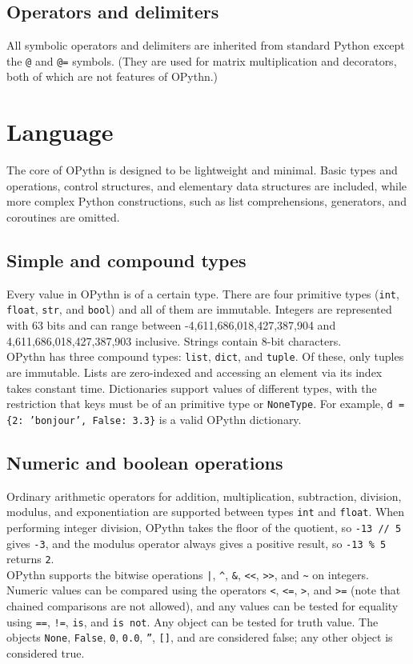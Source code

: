 \documentclass[11pt, twoside]{article}
\newcommand{\ms}{\texttt}
\begin{document}
    \subsection{Operators and delimiters}
    All symbolic operators and delimiters are inherited from standard Python except the \ms{@} and \ms{@=} symbols. (They are used for matrix multiplication and decorators, both of which are not features of OPythn.)

\section{Language}
    The core of OPythn is designed to be lightweight and minimal. Basic types and operations, control structures, and elementary data structures are included, while more complex Python constructions, such as list comprehensions, generators, and coroutines are omitted.
    \subsection{Simple and compound types}
    Every value in OPythn is of a certain type. There are four primitive types (\ms{int}, \ms{float}, \ms{str}, and \ms{bool}) and all of them are immutable. Integers are represented with 63 bits and can range between -4,611,686,018,427,387,904 and 4,611,686,018,427,387,903 inclusive. Strings contain 8-bit characters.\\
    \indent OPythn has three compound types: \ms{list}, \ms{dict}, and \ms{tuple}. Of these, only tuples are immutable. Lists are zero-indexed and accessing an element via its index takes constant time. Dictionaries support values of different types, with the restriction that keys must be of an primitive type or \ms{NoneType}. For example, \ms{d = \{2: 'bonjour', False: 3.3\}} is a valid OPythn dictionary.
   
    \subsection{Numeric and boolean operations}
    Ordinary arithmetic operators for addition, multiplication, subtraction, division, modulus, and exponentiation are supported between types \ms{int} and \ms{float}. When performing integer division, OPythn takes the floor of the quotient, so \ms{-13 // 5} gives \ms{-3}, and the modulus operator always gives a positive result, so \ms{-13 \% 5} returns \ms{2}.\\
    \indent OPythn supports the bitwise operations \ms{|}, \ms{\^}, \ms{\&}, \ms{<<}, \ms{>>}, and \ms{\~} on integers. Numeric values can be compared using the operators \ms{<}, \ms{<=}, \ms{>}, and \ms{>=} (note that chained comparisons are not allowed), and any values can be tested for equality using \ms{==}, \ms{!=}, \ms{is}, and \ms{is not}. Any object can be tested for truth value. The objects \ms{None}, \ms{False}, \ms{0}, \ms{0.0}, \ms{''}, \ms{[]}, and \ms{\string{\string}} are considered false; any other object is considered true.
\end{document}
